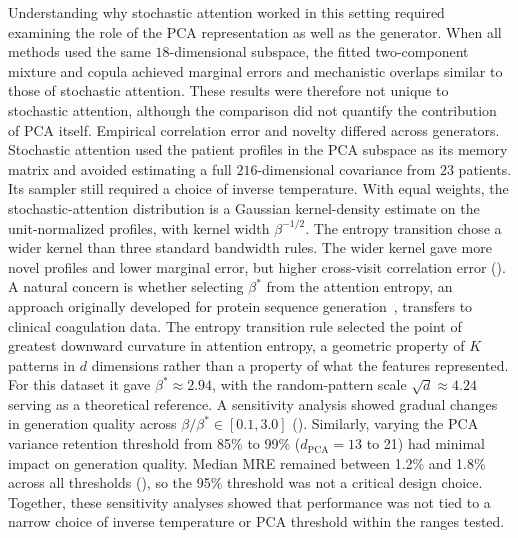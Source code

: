 Understanding why stochastic attention worked in this setting required examining the role of the
PCA representation as well as the generator. When all methods used
the same $18$-dimensional subspace, the fitted two-component mixture and copula achieved
marginal errors and mechanistic overlaps similar to those of stochastic attention. These results were therefore
not unique to stochastic attention, although the comparison did not quantify the contribution
of PCA itself. Empirical correlation error and novelty differed across generators. Stochastic
attention used the patient profiles in the PCA subspace as its memory matrix and avoided
estimating a full $216$-dimensional covariance from $23$ patients. Its sampler still required
a choice of inverse temperature.
With equal weights, the stochastic-attention distribution is a Gaussian kernel-density
estimate on the unit-normalized profiles, with kernel width $\beta^{-1/2}$. The entropy
transition chose a wider kernel than three standard bandwidth rules. The wider kernel gave more novel
profiles and lower marginal error, but higher cross-visit correlation error
(). A natural concern is whether selecting $\beta^*$ from the attention entropy, an
approach originally developed for protein sequence
generation~\citep{Varner2026SAProtein}, transfers to clinical coagulation data. The entropy
transition rule selected the point of greatest downward curvature in attention entropy, a
geometric property of $K$ patterns in $d$ dimensions rather than a property of what the
features represented. For this dataset it gave $\beta^* \approx 2.94$, with the random-pattern
scale $\sqrt{d} \approx 4.24$ serving as a theoretical reference. A sensitivity analysis
showed gradual changes in generation quality across $\beta/\beta^* \in [0.1, 3.0]$
().
Similarly, varying the PCA variance retention threshold from 85\% to 99\%
($d_{\text{PCA}} = 13$ to 21) had minimal impact on generation quality. Median MRE
remained between 1.2\% and 1.8\% across all thresholds (),
so the 95\% threshold was not a critical design choice. Together, these sensitivity
analyses showed that performance was not tied to a narrow choice of inverse temperature or
PCA threshold within the ranges tested.

